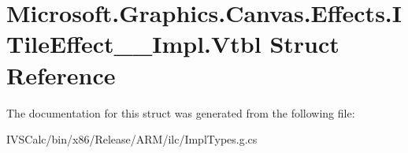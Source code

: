 \hypertarget{struct_microsoft_1_1_graphics_1_1_canvas_1_1_effects_1_1_i_tile_effect_____impl_1_1_vtbl}{}\section{Microsoft.\+Graphics.\+Canvas.\+Effects.\+I\+Tile\+Effect\+\_\+\+\_\+\+Impl.\+Vtbl Struct Reference}
\label{struct_microsoft_1_1_graphics_1_1_canvas_1_1_effects_1_1_i_tile_effect_____impl_1_1_vtbl}


The documentation for this struct was generated from the following file\+:\begin{DoxyCompactItemize}
\item 
I\+V\+S\+Calc/bin/x86/\+Release/\+A\+R\+M/ilc/Impl\+Types.\+g.\+cs\end{DoxyCompactItemize}
